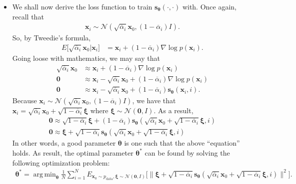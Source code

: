 \documentclass[10pt]{article}
\newcommand{\ve}[1]{\mathbf{#1}}
\newcommand{\mrm}[1]{\mathrm{#1}}
\newcommand{\ves}[1]{\boldsymbol{#1}}
\newcommand{\mcal}[1]{\mathcal{#1}}
\DeclareMathOperator*{\argmin}{arg\,min}
\begin{document}
\begin{itemize}
  \item We shall now derive the loss function to train $\ve{s}_{\ves{\theta}}(\cdot, \cdot)$ with. Once again, recall that
  \begin{align*}
    \ve{x}_i \sim \mcal{N}(\sqrt{\overline{\alpha}_i} \ve{x}_0, (1 - \overline{\alpha}_i) I).
  \end{align*}
  So, by Tweedie's formula,
  \begin{align*}
      E\big[\sqrt{\overline{\alpha}_i}\ve{x}_0 \big| \ve{x}_i \big] &= \ve{x}_i + (1 - \overline{\alpha}_i) \nabla \log p(\ve{x}_i).
  \end{align*}
  Going loose with mathematics, we may say that
  \begin{align*}
    \sqrt{\overline{\alpha}_i}\ve{x}_0 &\approx \ve{x}_i + (1 - \overline{\alpha}_i) \nabla \log p(\ve{x}_i) \\
    \ve{0} &\approx \ve{x}_i - \sqrt{\overline{\alpha}_i}\ve{x}_0 + (1 - \overline{\alpha}_i) \nabla \log p(\ve{x}_i) \\
    \ve{0} &\approx \ve{x}_i - \sqrt{\overline{\alpha}_i}\ve{x}_0 + (1 - \overline{\alpha}_i) \ve{s}_{\ves{\theta}}(\ve{x}_i, i).
  \end{align*}
  Because $\ve{x}_i \sim \mcal{N}(\sqrt{\overline{\alpha}_i} \ve{x}_0, (1 - \overline{\alpha}_i) I)$, we have that $\ve{x}_i = \sqrt{\overline{\alpha}_i} \ve{x}_0 + \sqrt{1 - \overline{\alpha}_i} \ves{\xi}$ where $\ves{\xi} \sim \mcal{N}(\ve{0}, I)$. As a result,
  \begin{align*}
    \ve{0} \approx \sqrt{1 - \overline{\alpha}_i} \ves{\xi} + (1 - \overline{\alpha}_i) \ve{s}_{\ves{\theta}}(\sqrt{\overline{\alpha}_i} \ve{x}_0 + \sqrt{1 - \overline{\alpha}_i} \ves{\xi}, i) \\
    \ve{0} \approx \ves{\xi} + \sqrt{1 - \overline{\alpha}_i} \ve{s}_{\ves{\theta}}(\sqrt{\overline{\alpha}_i} \ve{x}_0 + \sqrt{1 - \overline{\alpha}_i} \ves{\xi}, i)
  \end{align*}
  In other words, a good parameter $\ves{\theta}$ is one such that the above ``equation'' holds. As result, the optimal parameter $\ves{\theta}^*$ can be found by solving the following optimization problem:
  \begin{align*}
    \ves{\theta}^* = \argmin_{\ves{\theta}} \frac{1}{N} \sum_{i=1}^N E_{\ve{x}_0 \sim p_{\mrm{data}}, \ves{\xi} \sim \mcal{N}(\ve{0},I)} \big[ \big\| \ves{\xi} + \sqrt{1 - \overline{\alpha}_i} \ve{s}_{\ves{\theta}}(\sqrt{\overline{\alpha}_i} \ve{x}_0 + \sqrt{1 - \overline{\alpha}_i} \ves{\xi}, i) \big\|^2 \big].
  \end{align*}


\end{itemize}
\end{document}
